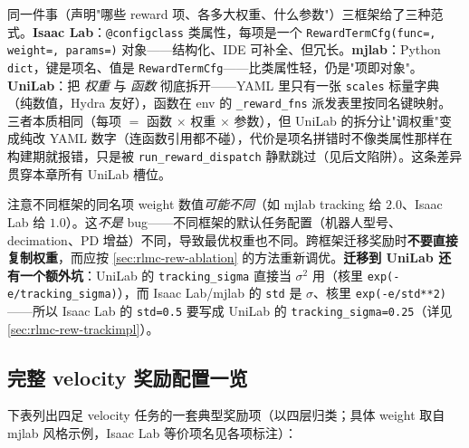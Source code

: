 \begin{insight}\label{ins:rlmc-rew-threeparadigm}
同一件事（声明"哪些 reward 项、各多大权重、什么参数"）三框架给了三种范式。\textbf{Isaac Lab}：\verb|@configclass| 类属性，每项是一个 \verb|RewardTermCfg(func=, weight=, params=)| 对象——结构化、IDE 可补全、但冗长。\textbf{mjlab}：Python \verb|dict|，键是项名、值是 \verb|RewardTermCfg|——比类属性轻，仍是"项即对象"。\textbf{UniLab}：把 \emph{权重} 与 \emph{函数} 彻底拆开——YAML 里只有一张 \verb|scales| 标量字典（纯数值，Hydra 友好），函数在 env 的 \verb|_reward_fns| 派发表里按同名键映射。三者本质相同（每项 $=$ 函数 $\times$ 权重 $\times$ 参数），但 UniLab 的拆分让"调权重"变成纯改 YAML 数字（连函数引用都不碰），代价是项名拼错时不像类属性那样在构建期就报错，只是被 \verb|run_reward_dispatch| 静默跳过（见后文陷阱）。这条差异贯穿本章所有 UniLab 槽位。
\end{insight}

\begin{pitfall}
注意不同框架的同名项 weight 数值\emph{可能不同}（如 mjlab tracking 给 $2.0$、Isaac Lab 给 $1.0$）。这\emph{不是} bug——不同框架的默认任务配置（机器人型号、decimation、PD 增益）不同，导致最优权重也不同。跨框架迁移奖励时\textbf{不要直接复制权重}，而应按 \cref{sec:rlmc-rew-ablation} 的方法重新调优。\textbf{迁移到 UniLab 还有一个额外坑}：UniLab 的 \verb|tracking_sigma| 直接当 $\sigma^2$ 用（核里 \verb|exp(-e/tracking_sigma)|），而 Isaac Lab/mjlab 的 \verb|std| 是 $\sigma$、核里 \verb|exp(-e/std**2)|——所以 Isaac Lab 的 \verb|std=0.5| 要写成 UniLab 的 \verb|tracking_sigma=0.25|（详见 \cref{sec:rlmc-rew-trackimpl}）。
\end{pitfall}

\subsection{完整 velocity 奖励配置一览}
\label{sec:rlmc-rew-fulltable}

下表列出四足 velocity 任务的一套典型奖励项（以四层归类；具体 weight 取自 mjlab 风格示例，Isaac Lab 等价项名见各项标注）：

